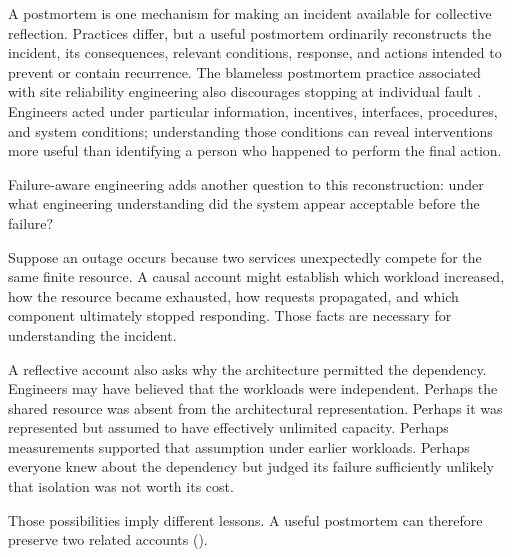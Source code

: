 A postmortem is one mechanism for making an incident available for collective reflection. Practices
differ, but a useful postmortem ordinarily reconstructs the incident, its consequences, relevant
conditions, response, and actions intended to prevent or contain recurrence. The blameless
postmortem practice associated with site reliability engineering also discourages stopping at
individual fault \citep{lunney2016postmortem}. Engineers acted under particular information, incentives,
interfaces, procedures, and system conditions; understanding those conditions can reveal
interventions more useful than identifying a person who happened to perform the final action.

Failure-aware engineering adds another question to this reconstruction: under what engineering
understanding did the system appear acceptable before the failure?

Suppose an outage occurs because two services unexpectedly compete for the same finite resource. A
causal account might establish which workload increased, how the resource became exhausted, how
requests propagated, and which component ultimately stopped responding. Those facts are necessary
for understanding the incident.

A reflective account also asks why the architecture permitted the dependency. Engineers may have
believed that the workloads were independent. Perhaps the shared resource was absent from the
architectural representation. Perhaps it was represented but assumed to have effectively unlimited
capacity. Perhaps measurements supported that assumption under earlier workloads. Perhaps everyone
knew about the dependency but judged its failure sufficiently unlikely that isolation was not worth
its cost.

Those possibilities imply different lessons. A useful postmortem can therefore preserve two related
accounts (\citet{tbl-causal-reflective}).

